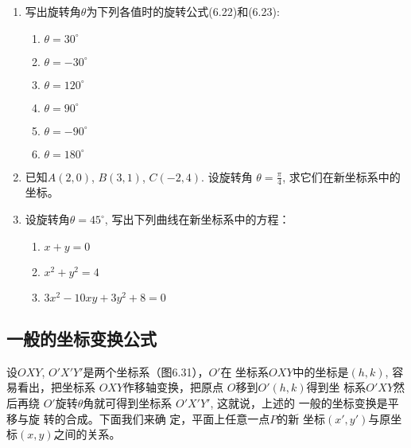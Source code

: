 \begin{ex}
\begin{enumerate}
    \item 写出旋转角$\theta$为下列各值时的旋转公式(6.22)和(6.23): 
\begin{multicols}{3}
\begin{enumerate}
    \item $\theta=30^{\circ}$
    \item $\theta=-30^{\circ}$
    \item $\theta = 120^{\circ}$
    \item $\theta = 90^{\circ}$
    \item $\theta = -90^{\circ}$
    \item $\theta = 180^{\circ}$
\end{enumerate}
\end{multicols}

    \item 已知$A(2,0)$, $B(3,1)$, $C(-2,4)$. 设旋转角
    $\theta = \frac{\pi}{4}$, 
    求它们在新坐标系中的坐标。
    \item 设旋转角$\theta=45^{\circ}$, 写出下列曲线在新坐标系中的方程：
    \begin{multicols}{2}
        \begin{enumerate}
    \item $x+y=0$
\item  $x^2+y^2=4$
\item $3x^2-10xy+3y^2+8=0$
\end{enumerate}
\end{multicols}
\end{enumerate}
\end{ex}

\subsection{一般的坐标变换公式}
设$OXY$, $O'X'Y'$是两个坐标系（图6.31），$O'$在
坐标系$OXY$中的坐标是$(h,k)$, 容易看出，把坐标系
$OXY$作移轴变换，把原点
$O$移到$O'(h,k)$得到坐
标系$O'XY$然后再绕
$O'$旋转$\theta$角就可得到坐标系
$O'X'Y'$, 这就说，上述的
一般的坐标变换是平移与旋
转的合成。下面我们来确
定，平面上任意一点$P$的新
坐标$(x',y')$与原坐标$(x,y)$之间的关系。

\begin{figure}[htp]
    \centering
{}

    \caption{}
\end{figure}


